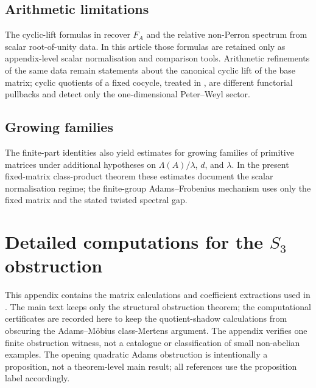 \documentclass[11pt,a4paper]{amsart}
\theoremstyle{plain}
\theoremstyle{definition}
\theoremstyle{remark}
\begin{document}
\subsection{Arithmetic limitations}
\label{app:arithmetic}

The cyclic-lift formulas in  recover \(F_A\) and
the relative non-Perron spectrum from scalar root-of-unity data.  In this
article those formulas are retained only as appendix-level scalar
normalisation and comparison tools.  Arithmetic refinements of the same data
remain statements about the canonical cyclic lift of the base matrix; cyclic
quotients of a fixed cocycle, treated in , are different
functorial pullbacks and detect only the one-dimensional Peter--Weyl sector.

\subsection{Growing families}
\label{app:rigidity}

The finite-part identities also yield estimates for growing families of
primitive matrices under additional hypotheses on
\(\Lambda(A)/\lambda\), \(d\), and \(\lambda\). In the present fixed-matrix
class-product theorem these estimates document the scalar normalisation
regime; the finite-group Adams--Frobenius mechanism uses only the fixed
matrix and the stated twisted spectral gap.

\section[Detailed computations for the S3 obstruction]{Detailed computations for the \texorpdfstring{$S_3$}{S3} obstruction}
\label{app:s3-model-computations}

This appendix contains the matrix calculations and coefficient extractions
used in . The main text keeps only the structural
obstruction theorem; the computational certificates are recorded here to
keep the quotient-shadow calculations from obscuring the Adams--M\"obius
class-Mertens argument.  The appendix verifies one finite obstruction witness,
not a catalogue or classification of small non-abelian examples.
The opening quadratic Adams obstruction is intentionally a proposition,
not a theorem-level main result; all references use the proposition label
accordingly.
\end{document}

